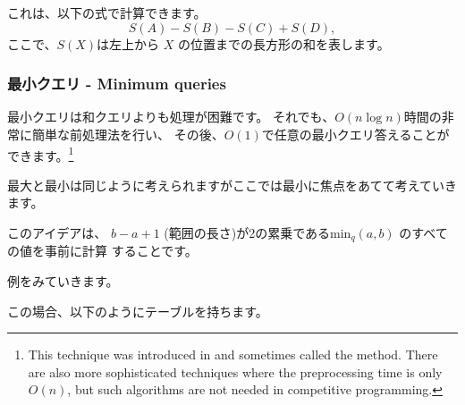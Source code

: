 これは、以下の式で計算できます。
\[S(A) - S(B) - S(C) + S(D),\]
ここで、$S(X )$は左上から $X$ の位置までの長方形の和を表します。

\subsubsection{最小クエリ - Minimum queries}


最小クエリは和クエリよりも処理が困難です。
それでも、$O(n \log n)$時間の非常に簡単な前処理法を行い、
その後、$O(1)$で任意の最小クエリ答えることができます。\footnote{This technique
was introduced in \cite{ben00} and sometimes
called the  method.
There are also more sophisticated techniques \cite{fis06} where
the preprocessing time is only $O(n)$, but such algorithms
are not needed in competitive programming.}

最大と最小は同じように考えられますがここでは最小に焦点をあてて考えていきます。

このアイデアは、
$b - a + 1$ (範囲の長さ)が2の累乗である$\textrm{min}_q(a,b)$
のすべての値を事前に計算 することです。

例をみていきます。
\begin{center}
\end{center}
この場合、以下のようにテーブルを持ちます。

